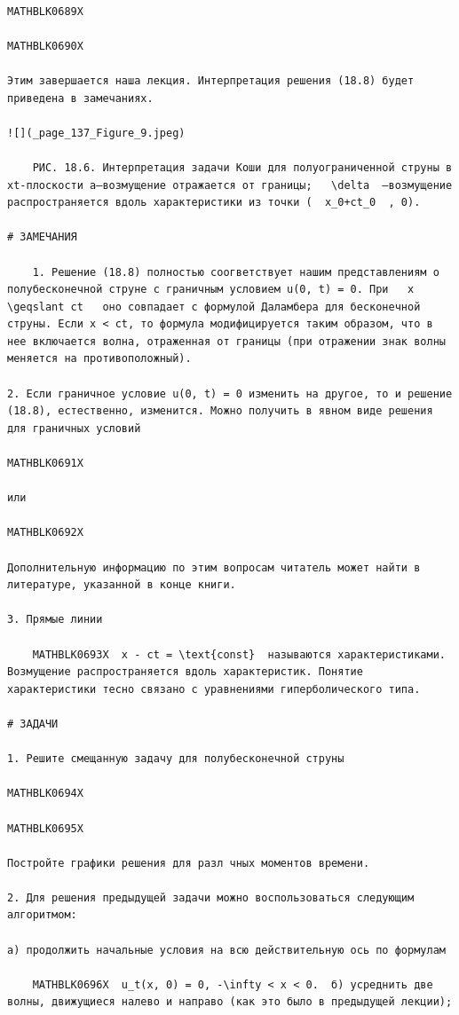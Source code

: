 \documentclass[
]{article}
\begin{document}
\begin{verbatim}

MATHBLK0689X

MATHBLK0690X

Этим завершается наша лекция. Интерпретация решения (18.8) будет приведена в замечаниях.

![](_page_137_Figure_9.jpeg)

    РИС. 18.6. Интерпретация задачи Коши для полуограниченной струны в xt-плоскости a—возмущение отражается от границы;   \delta  —возмущение распространяется вдоль характеристики из точки (  x_0+ct_0  , 0).

# ЗАМЕЧАНИЯ

    1. Решение (18.8) полностью соогветствует нашим представлениям о полубесконечной струне с граничным условием u(0, t) = 0. При   x \geqslant ct   оно совпадает с формулой Даламбера для бесконечной струны. Если x < ct, то формула модифицируется таким образом, что в нее включается волна, отраженная от границы (при отражении знак волны меняется на противоположный).

2. Если граничное условие u(0, t) = 0 изменить на другое, то и решение (18.8), естественно, изменится. Можно получить в явном виде решения для граничных условий

MATHBLK0691X

или

MATHBLK0692X

Дополнительную информацию по этим вопросам читатель может найти в литературе, указанной в конце книги.

3. Прямые линии

    MATHBLK0693X  x - ct = \text{const}  называются характеристиками. Возмущение распространяется вдоль характеристик. Понятие характеристики тесно связано с уравнениями гиперболического типа.

# ЗАДАЧИ

1. Решите смещанную задачу для полубесконечной струны

MATHBLK0694X

MATHBLK0695X

Постройте графики решения для разл чных моментов времени.

2. Для решения предыдущей задачи можно воспользоваться следующим алгоритмом:

а) продолжить начальные условия на всю действительную ось по формулам

    MATHBLK0696X  u_t(x, 0) = 0, -\infty < x < 0.  б) усреднить две волны, движущиеся налево и направо (как это было в предыдущей лекции);


\end{verbatim}
\end{document}
